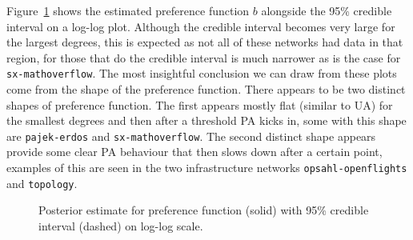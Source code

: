 \documentclass[
  sn-basic,
]{sn-jnl}
\theoremstyle{plain}
\theoremstyle{remark}
\begin{document}
Figure~\ref{fig-pa} shows the estimated preference function \(b\)
alongside the 95\% credible interval on a log-log plot. Although the
credible interval becomes very large for the largest degrees, this is
expected as not all of these networks had data in that region, for those
that do the credible interval is much narrower as is the case for
\texttt{sx-mathoverflow}. The most insightful conclusion we can draw
from these plots come from the shape of the preference function. There
appears to be two distinct shapes of preference function. The first
appears mostly flat (similar to UA) for the smallest degrees and then
after a threshold PA kicks in, some with this shape are
\texttt{pajek-erdos} and \texttt{sx-mathoverflow}. The second distinct
shape appears provide some clear PA behaviour that then slows down after
a certain point, examples of this are seen in the two infrastructure
networks \texttt{opsahl-openflights} and \texttt{topology}.

\begin{figure}[H]


\caption{\label{fig-pa}Posterior estimate for preference function
(solid) with 95\% credible interval (dashed) on log-log scale.}

\end{figure}%
\end{document}
